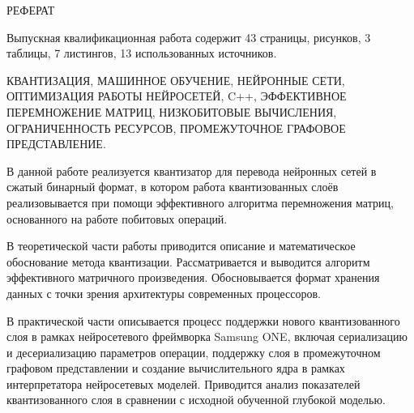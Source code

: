 \begin{center}
РЕФЕРАТ
\end{center}









Выпускная квалификационная работа содержит 43 страницы,  рисунков, 3 таблицы, 7 листингов, 13 использованных источников.


КВАНТИЗАЦИЯ, МАШИННОЕ ОБУЧЕНИЕ, НЕЙРОННЫЕ СЕТИ, ОПТИМИЗАЦИЯ РАБОТЫ НЕЙРОСЕТЕЙ, C++, ЭФФЕКТИВНОЕ ПЕРЕМНОЖЕНИЕ МАТРИЦ, НИЗКОБИТОВЫЕ ВЫЧИСЛЕНИЯ, ОГРАНИЧЕННОСТЬ РЕСУРСОВ, ПРОМЕЖУТОЧНОЕ ГРАФОВОЕ ПРЕДСТАВЛЕНИЕ.

В данной работе реализуется квантизатор для перевода нейронных сетей в сжатый бинарный формат, в котором работа квантизованных слоёв реализовывается при помощи эффективного алгоритма перемножения матриц, основанного на работе побитовых операций.

В теоретической части работы приводится описание и математическое обоснование метода квантизации. Рассматривается и выводится алгоритм эффективного матричного произведения. Обосновывается формат хранения данных с точки зрения архитектуры современных процессоров. 

В практической части описывается процесс поддержки нового квантизованного слоя в рамках нейросетевого фреймворка Samsung ONE, включая сериализацию  и десериализацию параметров операции, поддержку слоя в промежуточном графовом представлении и создание вычислительного ядра в рамках интерпретатора нейросетевых моделей. Приводится анализ показателей квантизованного слоя в сравнении с исходной обученной глубокой моделью.
